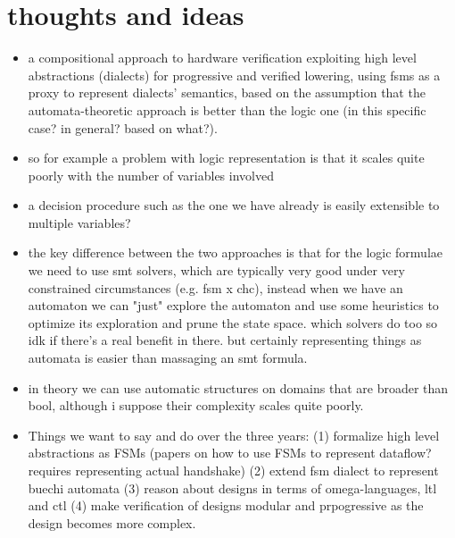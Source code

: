 \documentclass[]{article}
\begin{document}
\section{thoughts and ideas}

\begin{itemize}
    \item a compositional approach to hardware verification exploiting high level abstractions (dialects)
    for progressive and verified lowering, using fsms as a proxy to represent dialects' semantics, 
    based on the assumption that the automata-theoretic approach is better than the logic one (in this specific case? in general? based on what?).
    \item so for example a problem with logic representation is that it scales quite poorly with the number of variables involved
    \item a decision procedure such as the one we have already is easily extensible to multiple variables? 
    \item the key difference between the two approaches is that for the logic formulae we need to use smt solvers, which are typically very good under 
    very constrained circumstances (e.g. fsm x chc), instead when we have an automaton we can "just" explore the automaton and use some 
    heuristics to optimize its exploration and prune the state space. which solvers do too so idk if there's a real benefit in there. 
    but certainly representing things as automata is easier than massaging an smt formula. 
    \item in theory we can use automatic structures on domains that are broader than bool, although i suppose their complexity scales quite poorly. 
    \item Things we want to say and do over the three years: 
    (1) formalize high level abstractions as FSMs (papers on how to use FSMs to represent dataflow? requires representing actual handshake)
    (2) extend fsm dialect to represent buechi automata 
    (3) reason about designs in terms of omega-languages, ltl and ctl
    (4) make verification of designs modular and prpogressive as the design becomes more complex.
\end{itemize}
\end{document}
